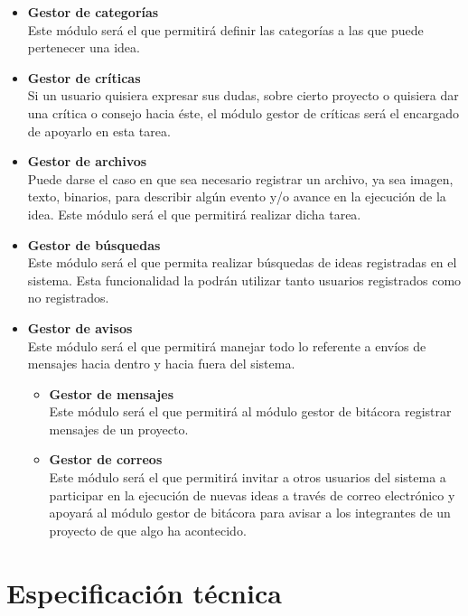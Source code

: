 \documentclass[11pt,letterpaper,titlepage]{article}
\begin{document}
\begin{itemize}
 \item \textbf{Gestor de categor\'ias}\\
Este m\'odulo ser\'a el que permitir\'a definir las categor\'ias a las que puede pertenecer una idea.


 \item \textbf{Gestor de cr\'iticas}\\
Si un usuario quisiera expresar sus dudas, sobre cierto proyecto o quisiera dar una cr\'itica o consejo hacia \'este, el m\'odulo gestor de cr\'iticas ser\'a el encargado de apoyarlo en esta tarea.

 \item \textbf{Gestor de archivos}\\
Puede darse el caso en que sea necesario registrar un archivo, ya sea imagen, texto, binarios, para describir alg\'un evento y/o avance en la ejecuci\'on de la idea. Este m\'odulo ser\'a el que permitir\'a realizar dicha tarea.

 \item \textbf{Gestor de b\'usquedas}\\
Este m\'odulo ser\'a el que permita realizar b\'usquedas de ideas registradas en el sistema. Esta funcionalidad la podr\'an utilizar tanto usuarios registrados como no registrados.

 \item \textbf{Gestor de avisos}\\
Este m\'odulo ser\'a el que permitir\'a manejar todo lo referente a env\'ios de mensajes hacia dentro y hacia fuera del sistema. 
 
\begin{itemize}
 \item  \textbf{Gestor de mensajes}\\
Este m\'odulo ser\'a el que permitir\'a al m\'odulo gestor de bit\'acora registrar mensajes de un proyecto.

 \item \textbf{Gestor de correos}\\
Este m\'odulo ser\'a el que permitir\'a invitar a otros usuarios del sistema a participar en la ejecuci\'on de nuevas ideas a trav\'es de correo electr\'onico y apoyar\'a al m\'odulo gestor de bit\'acora para avisar a los integrantes de un proyecto de que algo ha acontecido.
\end{itemize}
\end{itemize}


\section{Especificaci\'on t\'ecnica}
\end{document}
